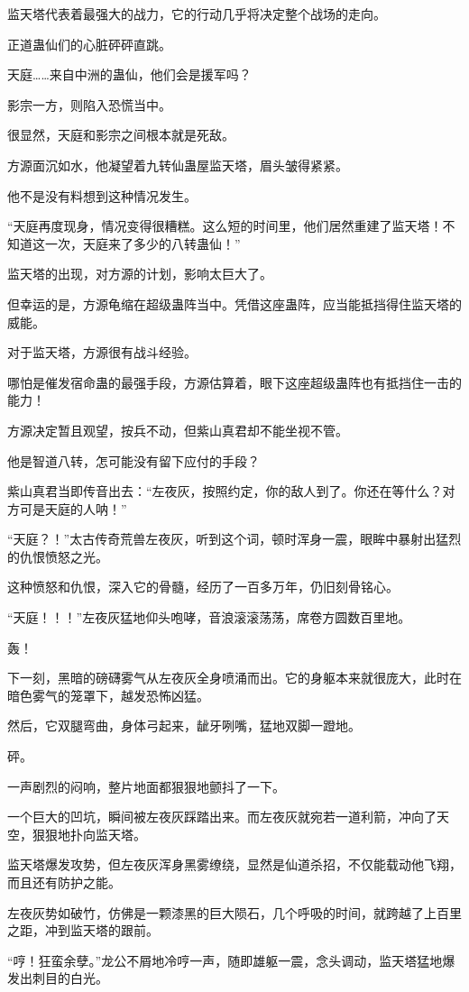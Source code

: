 \begin{this_body}
监天塔代表着最强大的战力，它的行动几乎将决定整个战场的走向。

正道蛊仙们的心脏砰砰直跳。

天庭……来自中洲的蛊仙，他们会是援军吗？

影宗一方，则陷入恐慌当中。

很显然，天庭和影宗之间根本就是死敌。

方源面沉如水，他凝望着九转仙蛊屋监天塔，眉头皱得紧紧。

他不是没有料想到这种情况发生。

“天庭再度现身，情况变得很糟糕。这么短的时间里，他们居然重建了监天塔！不知道这一次，天庭来了多少的八转蛊仙！”

监天塔的出现，对方源的计划，影响太巨大了。

但幸运的是，方源龟缩在超级蛊阵当中。凭借这座蛊阵，应当能抵挡得住监天塔的威能。

对于监天塔，方源很有战斗经验。

哪怕是催发宿命蛊的最强手段，方源估算着，眼下这座超级蛊阵也有抵挡住一击的能力！

方源决定暂且观望，按兵不动，但紫山真君却不能坐视不管。

他是智道八转，怎可能没有留下应付的手段？

紫山真君当即传音出去：“左夜灰，按照约定，你的敌人到了。你还在等什么？对方可是天庭的人呐！”

“天庭？！”太古传奇荒兽左夜灰，听到这个词，顿时浑身一震，眼眸中暴射出猛烈的仇恨愤怒之光。

这种愤怒和仇恨，深入它的骨髓，经历了一百多万年，仍旧刻骨铭心。

“天庭！！！”左夜灰猛地仰头咆哮，音浪滚滚荡荡，席卷方圆数百里地。

轰！

下一刻，黑暗的磅礴雾气从左夜灰全身喷涌而出。它的身躯本来就很庞大，此时在暗色雾气的笼罩下，越发恐怖凶猛。

然后，它双腿弯曲，身体弓起来，龇牙咧嘴，猛地双脚一蹬地。

砰。

一声剧烈的闷响，整片地面都狠狠地颤抖了一下。

一个巨大的凹坑，瞬间被左夜灰踩踏出来。而左夜灰就宛若一道利箭，冲向了天空，狠狠地扑向监天塔。

监天塔爆发攻势，但左夜灰浑身黑雾缭绕，显然是仙道杀招，不仅能载动他飞翔，而且还有防护之能。

左夜灰势如破竹，仿佛是一颗漆黑的巨大陨石，几个呼吸的时间，就跨越了上百里之距，冲到监天塔的跟前。

“哼！狂蛮余孽。”龙公不屑地冷哼一声，随即雄躯一震，念头调动，监天塔猛地爆发出刺目的白光。


\end{this_body}

